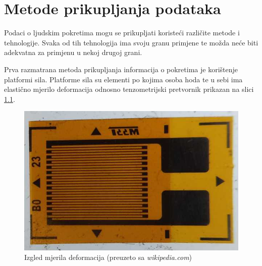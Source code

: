 \documentclass[times, utf8, diplomski]{fer}
\begin{document}
\chapter{Metode prikupljanja podataka}
Podaci o ljudskim pokretima mogu se prikupljati koristeći različite metode i tehnologije.
Svaka od tih tehnologija ima svoju granu primjene te možda neće biti adekvatna za primjenu u nekoj drugoj grani.

Prva razmatrana metoda prikupljanja informacija o pokretima je korištenje platformi sila. Platforme sila su elementi po kojima osoba
hoda te u sebi ima elastično mjerilo deformacija odnosno tenzometrijski pretvornik prikazan na slici \ref{defgag}. 

\begin{figure}[h!]
    \includegraphics[width=\textwidth]{strain_gauge.jpg}
    \caption{Izgled mjerila deformacija (preuzeto sa \textit{wikipedia.com})}
    \label{defgag}
\end{figure}
\end{document}
